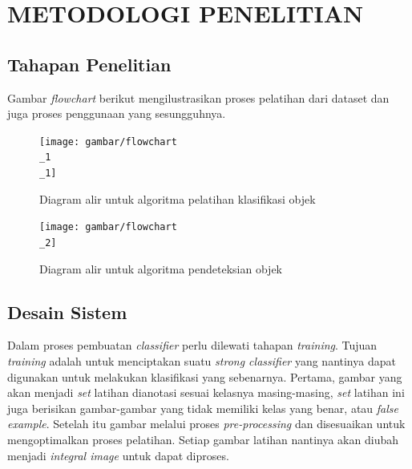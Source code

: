 
\chapter{METODOLOGI PENELITIAN}

\section{Tahapan Penelitian}

Gambar \textit{flowchart} berikut mengilustrasikan proses pelatihan 
 dari dataset dan juga proses penggunaan yang sesungguhnya.

\begin{figure}[H]
  \centering{}
	\texttt{[image: gambar/flowchart\\\_1\\\_1]}
  \caption{Diagram alir untuk algoritma pelatihan klasifikasi objek}
\end{figure}

\begin{figure}[H]
  \centering{}
	\texttt{[image: gambar/flowchart\\\_2]}
  \caption{Diagram alir untuk algoritma pendeteksian objek}
\end{figure}


\section{Desain Sistem}

Dalam proses pembuatan \emph{classifier} perlu dilewati tahapan \textit{training}. 
Tujuan \textit{training} adalah untuk menciptakan suatu \emph{strong classifier} 
yang nantinya dapat digunakan untuk melakukan klasifikasi yang sebenarnya.
Pertama, gambar yang akan menjadi \textit{set} latihan dianotasi sesuai kelasnya masing-masing, 
\textit{set} latihan ini juga berisikan gambar-gambar yang tidak memiliki kelas yang benar, atau 
\emph{false example}. Setelah itu gambar melalui proses \emph{pre-processing} dan disesuaikan 
untuk mengoptimalkan proses pelatihan. Setiap gambar latihan nantinya akan 
diubah menjadi \emph{integral image} untuk dapat diproses.

